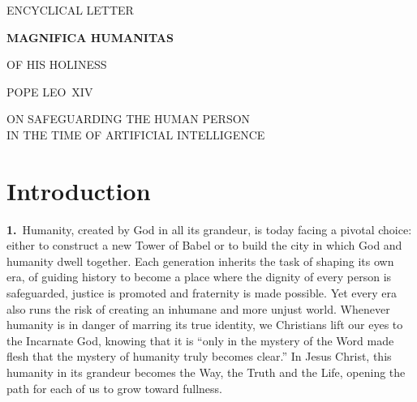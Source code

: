 \documentclass{article}
\begin{document}
\begin{titlepage}
\centering
{}

{\LARGE ENCYCLICAL LETTER\par}
\vspace{4em}

{\huge\bfseries MAGNIFICA HUMANITAS\par}
\vspace{4em}

{\Large OF HIS HOLINESS\par}
\vspace{0.3em}
{\LARGE POPE LEO~XIV\par}


{\Large ON SAFEGUARDING THE HUMAN PERSON\\[0.4em]
IN THE TIME OF ARTIFICIAL INTELLIGENCE\par}

\end{titlepage}

\begingroup
{} %
\tableofcontents
\endgroup
\clearpage

\section{Introduction}

\textbf{1.}\ Humanity, created by God in all its grandeur, is today facing a pivotal choice: either to construct a new Tower of Babel or to build the city in which God and humanity dwell together. Each generation inherits the task of shaping its own era, of guiding history to become a place where the dignity of every person is safeguarded, justice is promoted and fraternity is made possible. Yet every era also runs the risk of creating an inhumane and more unjust world. Whenever humanity is in danger of marring its true identity, we Christians lift our eyes to the Incarnate God, knowing that it is ``only in the mystery of the Word made flesh that the mystery of humanity truly becomes clear.''\cite{n1} In Jesus Christ, this humanity in its grandeur becomes the Way, the Truth and the Life, opening the path for each of us to grow toward fullness.
\end{document}
